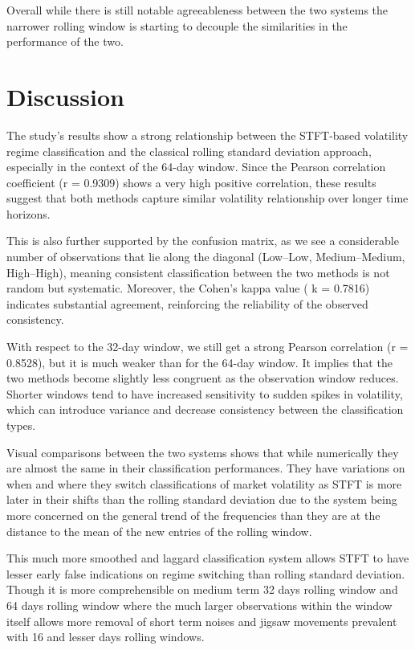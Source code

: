 \documentclass[12pt,letterpaper]{article}
\begin{document}
		Overall while there is still notable agreeableness between the two systems the narrower rolling window is starting to decouple the similarities in the performance of the two.
		
		
	\section{Discussion}
		The study’s results show a strong relationship between the STFT-based volatility regime classification and the classical rolling standard deviation approach, especially in the context of the 64-day window. Since the Pearson correlation coefficient (r = 0.9309) shows a very high positive correlation, these results suggest that both methods capture similar volatility relationship over longer time horizons. 
		
		This is also further supported by the confusion matrix, as we see a considerable number of observations that lie along the diagonal (Low–Low, Medium–Medium, High–High), meaning consistent classification between the two methods is not random but systematic. Moreover, the Cohen’s kappa value ( k = 0.7816) indicates substantial agreement, reinforcing the reliability of the observed consistency.
		
		With respect to the 32-day window, we still get a strong Pearson correlation (r = 0.8528), but it is much weaker than for the 64-day window. It implies that the two methods become slightly less congruent as the observation window reduces. Shorter windows tend to have increased sensitivity to sudden spikes in volatility, which can introduce variance and decrease consistency between the classification types. 
		
		Visual comparisons between the two systems shows that while numerically they are almost the same in their classification performances. They have variations on when and where they switch classifications of market volatility as STFT is more later in their shifts than the rolling standard deviation due to the system being more concerned on the general trend of the frequencies than they are at the distance to the mean of the new entries of the rolling window.
		
		This much more smoothed and laggard classification system allows STFT to have lesser early false indications on regime switching than rolling standard deviation. Though it is more comprehensible on medium term 32 days rolling window and 64 days rolling window where the much larger observations within the window itself allows more removal of short term noises and jigsaw movements prevalent with 16 and lesser days rolling windows.
		
\end{document}
